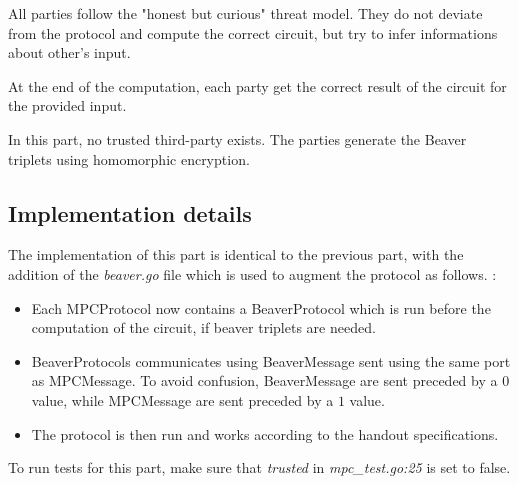 \documentclass[10pt,conference]{IEEEtran}
\begin{document}
\begin{itemize}
All parties follow the "honest but curious" threat model. They do not deviate from the protocol and compute the correct circuit, but try to infer informations about other's input.

At the end of the computation, each party get the correct result of the circuit for the provided input.

In this part, no trusted third-party exists. The parties generate the Beaver triplets using homomorphic encryption.
\subsection{Implementation details}
The implementation of this part is identical to the previous part, with the addition of the \textit{beaver.go} file which is used to augment the protocol as follows. : 
\begin{itemize}
    \item Each MPCProtocol now contains a BeaverProtocol which is run before the computation of the circuit, if beaver triplets are needed.
    \item BeaverProtocols communicates using BeaverMessage sent using the same port as MPCMessage. To avoid confusion, BeaverMessage are sent preceded by a $0$ value, while MPCMessage are sent preceded by a $1$ value.
    \item The protocol is then run and works according to the handout specifications.
\end{itemize}

To run tests for this part, make sure that \textit{trusted} in \textit{mpc\_test.go:25} is set to false.

\end{itemize}
\end{document}

